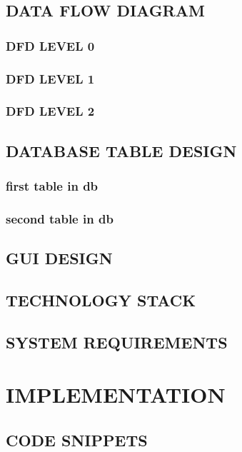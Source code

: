 \documentclass[a4paper,12pt]{report}
\begin{document}
\section{DATA FLOW DIAGRAM}
\subsection{DFD LEVEL 0}
\renewcommand\thefigure{\thechapter.\arabic{figure}}


\subsection{DFD LEVEL 1}

\subsection{DFD LEVEL 2}
\renewcommand\thefigure{\thechapter.\arabic{figure}}


\newpage
\section{DATABASE TABLE DESIGN}
\subsection{first table in db}

\subsection{second table in db}




\section{GUI DESIGN}

\section{TECHNOLOGY STACK}

\section{SYSTEM REQUIREMENTS}


\chapter{IMPLEMENTATION}

\section{CODE SNIPPETS}
\noindent
\end{document}
